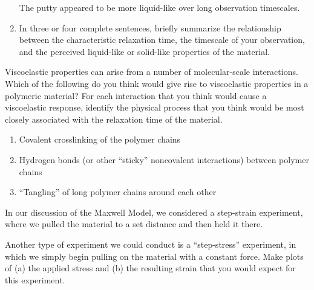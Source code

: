 \begin{activity}
\begin{ctqs}
\begin{enumerate}
					\begin{solution}[0.75in]
					
						The putty appeared to be more liquid-like over long observation timescales.
						
					\end{solution}
				
				\item In three or four complete sentences, briefly summarize the relationship between the characteristic relaxation time, the timescale of your observation, and the perceived liquid-like or solid-like properties of the material.
	
					\begin{solution}[2.5in]
					\end{solution}
			\end{enumerate}
		
\end{ctqs}
	

\begin{exercises}

		\exercise Viscoelastic properties can arise from a number of molecular-scale interactions.  Which of the following do you think would give rise to viscoelastic properties in a polymeric material?  For each interaction that you think would cause a viscoelastic response, identify the physical process that you think would be most closely associated with the relaxation time of the material.
		
			\begin{enumerate}
				\item Covalent crosslinking of the polymer chains
				\item Hydrogen bonds (or other ``sticky'' noncovalent interactions) between polymer chains
				\item ``Tangling'' of long polymer chains around each other
			\end{enumerate}
			
		
		\exercise In our discussion of the Maxwell Model, we considered a step-strain experiment, where we pulled the material to a set distance and then held it there.
		
			Another type of experiment we could conduct is a ``step-stress'' experiment, in which we simply begin pulling on the material with a constant force.  Make plots of (a) the applied stress and (b) the resulting strain that you would expect for this experiment.
			

\end{exercises}
\end{activity}
